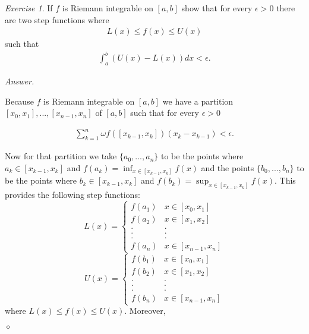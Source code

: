 \documentclass[12pt,oneside]{amsart}
\theoremstyle{definition}
\theoremstyle{remark}
\newtheorem{exer}{Exercise}
\numberwithin{equation}{exer}
\newenvironment{answer}{\bigskip\noindent\emph{Answer.}}{\hfill$\diamond$\newline}
\begin{document}
\newpage
\indent\newline


\begin{exer}

If $f$ is Riemann integrable on $[a,b]$ show that for every $\epsilon>0$ there are two step functions where 
\begin{align*}
    L(x)\leq f(x)\leq U(x)
\end{align*}
such that
\begin{align*}
    \int_a^b(U(x)-L(x))dx<\epsilon.
\end{align*}

\end{exer}

\begin{answer}

Because $f$ is Riemann integrable on $[a,b]$ we have a partition $[x_0,x_1],...,[x_{n-1},x_n]$ of $[a,b]$ such that for every $\epsilon > 0$ 

\begin{align*}
    \sum_{k=1}^n \omega f([x_{k-1},x_k])(x_k-x_{k-1})< \epsilon.
\end{align*}

Now for that partition we take $\{a_0,...,a_n\}$ to be the points where  $a_k\in[x_{k-1},x_k]$ and $f(a_k)=\inf_{x\in[x_{k-1},x_k]} f(x)$ and the points $\{b_0,...,b_n\}$ to be the points where $b_k\in[x_{k-1},x_k]$ and $f(b_k)=\sup_{x\in[x_{k-1},x_k]} f(x)$. This provides the following step functions:
\begin{equation*}
    L(x) = \begin{cases}
               f(a_1)               & x\in[x_0,x_1]\\
               f(a_2)               & x\in[x_1,x_2]\\
               .              & .\\
               .               & .\\
               .               & .\\
               f(a_n) & x\in[x_{n-1},x_n]
           \end{cases}
\end{equation*}
\begin{equation*}
    U(x) = \begin{cases}
               f(b_1)               & x\in[x_0,x_1]\\
               f(b_2)               & x\in[x_1,x_2]\\
               .              & .\\
               .               & .\\
               .               & .\\
               f(b_n) & x\in[x_{n-1},x_n]
           \end{cases}
\end{equation*}
\indent\newline
where  $L(x)\leq f(x)\leq U(x)$. Moreover, 


\end{answer}
\end{document}
